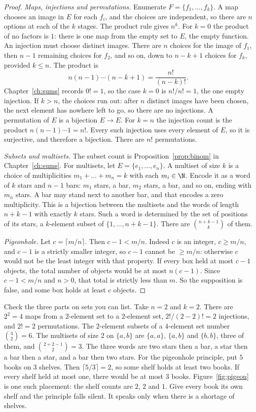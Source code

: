 \begin{proof}
\emph{Maps, injections and permutations.} Enumerate $F=\{f_1,\dots,f_k\}$. A map chooses an image in $E$ for each $f_i$, and the choices are independent, so there are $n$ options at each of the $k$ stages. The product rule gives $n^k$. For $k=0$ the product of no factors is $1$: there is one map from the empty set to $E$, the empty function. An injection must choose distinct images. There are $n$ choices for the image of $f_1$, then $n-1$ remaining choices for $f_2$, and so on, down to $n-k+1$ choices for $f_k$, provided $k\le n$. The product is
\[
n(n-1)\cdots(n-k+1)=\frac{n!}{(n-k)!}.
\]
Chapter~\ref{ch:sums} records $0!=1$, so the case $k=0$ is $n!/n!=1$, the one empty injection. If $k>n$, the choices run out: after $n$ distinct images have been chosen, the next element has nowhere left to go, so there are no injections. A permutation of $E$ is a bijection $E\to E$. For $k=n$ the injection count is the product $n(n-1)\cdots 1=n!$. Every such injection uses every element of $E$, so it is surjective, and therefore a bijection. There are $n!$ permutations.

\emph{Subsets and multisets.} The subset count is Proposition~\ref{prop:binom} in Chapter~\ref{ch:sums}. For multisets, let $E=\{e_1,\dots,e_n\}$. A multiset of size $k$ is a choice of multiplicities $m_1+\dots+m_n=k$ with each $m_i\in\N$. Encode it as a word of $k$ stars and $n-1$ bars: $m_1$ stars, a bar, $m_2$ stars, a bar, and so on, ending with $m_n$ stars. A bar may stand next to another bar, and that encodes a zero multiplicity. This is a bijection between the multisets and the words of length $n+k-1$ with exactly $k$ stars. Such a word is determined by the set of positions of its stars, a $k$-element subset of $\{1,\dots,n+k-1\}$. There are $\binom{n+k-1}k$ of them.

\emph{Pigeonhole.} Let $c=\lceil m/n\rceil$. Then $c-1<m/n$. Indeed $c$ is an integer, $c\ge m/n$, and $c-1$ is a strictly smaller integer, so $c-1$ cannot be $\ge m/n$: otherwise $c$ would not be the least integer with that property. If every box held at most $c-1$ objects, the total number of objects would be at most $n(c-1)$. Since $c-1<m/n$ and $n>0$, that total is strictly less than $m$. So the supposition is false, and some box holds at least $c$ objects.
\end{proof}

Check the three parts on sets you can list. Take $n=2$ and $k=2$. There are $2^2=4$ maps from a $2$-element set to a $2$-element set, $2!/(2-2)! = 2$ injections, and $2!=2$ permutations. The $2$-element subsets of a $4$-element set number $\binom42=6$. The multisets of size $2$ on $\{a,b\}$ are $\{a,a\}$, $\{a,b\}$ and $\{b,b\}$, three of them, and $\binom{2+2-1}{2}=3$. The three words are two stars then a bar, a star then a bar then a star, and a bar then two stars. For the pigeonhole principle, put $5$ books on $3$ shelves. Then $\lceil 5/3\rceil=2$, so some shelf holds at least two books. If every shelf held at most one, there would be at most $3$ books. Figure~\ref{fig:pigeon} is one such placement: the shelf counts are $2$, $2$ and $1$. Give every book its own shelf and the principle falls silent. It speaks only when there is a shortage of shelves.

